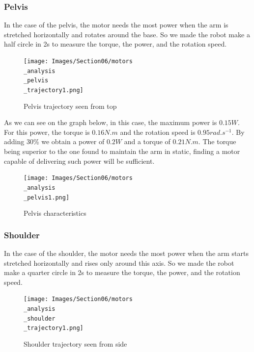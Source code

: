 \subsubsection{Pelvis}

In the case of the pelvis, the motor needs the most power when the arm is stretched horizontally and rotates around the base. So we made the robot make a half circle in 2s to measure the torque, the power, and the rotation speed.
\begin{figure}[ht]
    \centering
    \texttt{[image: Images/Section06/motors\\\_analysis\\\_pelvis\\\_trajectory1.png]}
    \caption{Pelvis trajectory seen from top}
    \label{fig:PelvisTrajectory}
\end{figure}
\FloatBarrier

\bigbreak
As we can see on the graph below, in this case, the maximum power is $0.15W$. For this power, the torque is $0.16N.m$ and the rotation speed is $0.95rad.s^{-1}$. By adding 30\% we obtain a power of $0.2W$ and a torque of $0.21N.m$. The torque being superior to the one found to maintain the arm in static, finding a motor capable of delivering such power will be sufficient.
\begin{figure}[ht]
    \centering
    \texttt{[image: Images/Section06/motors\\\_analysis\\\_pelvis1.png]}
    \caption{Pelvis characteristics}
    \label{fig:PelvisCharacteristics}
\end{figure}
\FloatBarrier

\subsubsection{Shoulder}

In the case of the shoulder, the motor needs the most power when the arm starts stretched horizontally and rises only around this axis. So we made the robot make a quarter circle in 2s to measure the torque, the power, and the rotation speed.
\begin{figure}[ht]
    \centering
    \texttt{[image: Images/Section06/motors\\\_analysis\\\_shoulder\\\_trajectory1.png]}
    \caption{Shoulder trajectory seen from side}
    \label{fig:ShoulderTrajectory}
\end{figure}
\FloatBarrier

